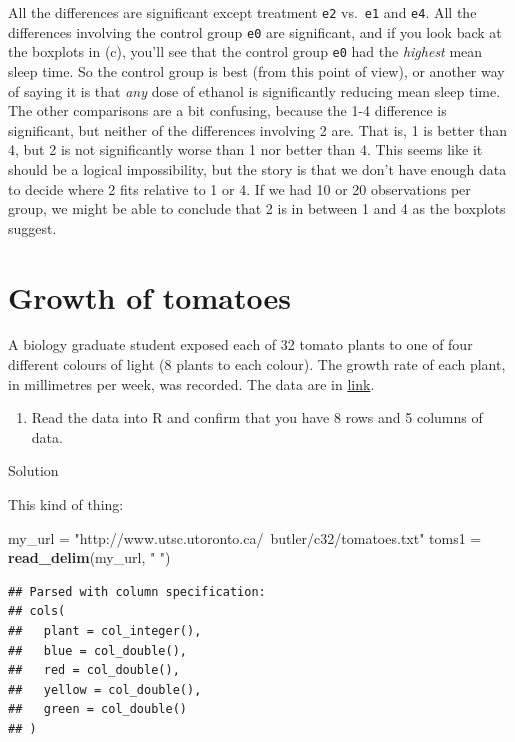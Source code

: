 \documentclass[]{tufte-book}
\newenvironment{Shaded}{}{}
\newcommand{\KeywordTok}[1]{\textcolor[rgb]{0.00,0.44,0.13}{\textbf{#1}}}
\newcommand{\NormalTok}[1]{#1}
\newcommand{\StringTok}[1]{\textcolor[rgb]{0.25,0.44,0.63}{#1}}
\providecommand{\tightlist}{%
  \setlength{\itemsep}{0pt}\setlength{\parskip}{0pt}}
\theoremstyle{definition}
\theoremstyle{definition}
\theoremstyle{definition}
\theoremstyle{remark}
\begin{document}
All the differences are significant except treatment \texttt{e2}
vs.~\texttt{e1} and \texttt{e4}. All the differences involving the
control group \texttt{e0} are significant, and if you look back at the
boxplots in (c), you'll see that the control group \texttt{e0} had the
\emph{highest} mean sleep time. So the control group is best (from this
point of view), or another way of saying it is that \emph{any} dose of
ethanol is significantly reducing mean sleep time. The other comparisons
are a bit confusing, because the 1-4 difference is significant, but
neither of the differences involving 2 are. That is, 1 is better than 4,
but 2 is not significantly worse than 1 nor better than 4. This seems
like it should be a logical impossibility, but the story is that we
don't have enough data to decide where 2 fits relative to 1 or 4. If we
had 10 or 20 observations per group, we might be able to conclude that 2
is in between 1 and 4 as the boxplots suggest.

\hypertarget{growth-of-tomatoes}{%
\section{Growth of tomatoes}\label{growth-of-tomatoes}}

A biology graduate student exposed each of 32 tomato plants to one of
four different colours of light (8 plants to each colour). The growth
rate of each plant, in millimetres per week, was recorded. The data are
in \href{http://www.utsc.utoronto.ca/~butler/c32/tomatoes.txt}{link}.

\begin{enumerate}
\def\labelenumi{(\alph{enumi})}
\tightlist
\item
  Read the data into R and confirm that you have 8 rows and 5 columns of
  data.
\end{enumerate}

Solution

This kind of thing:

\begin{Shaded}
\begin{Highlighting}[]
\NormalTok{my_url =}\StringTok{ "http://www.utsc.utoronto.ca/~butler/c32/tomatoes.txt"}
\NormalTok{toms1 =}\StringTok{ }\KeywordTok{read_delim}\NormalTok{(my_url, }\StringTok{" "}\NormalTok{)}
\end{Highlighting}
\end{Shaded}

\begin{verbatim}
## Parsed with column specification:
## cols(
##   plant = col_integer(),
##   blue = col_double(),
##   red = col_double(),
##   yellow = col_double(),
##   green = col_double()
## )
\end{verbatim}
\end{document}
